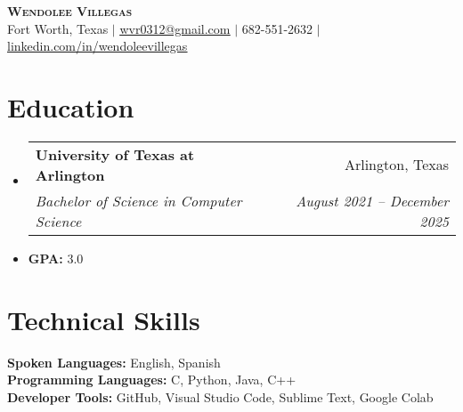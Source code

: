 \documentclass[letterpaper,11pt]{article}
\makeatletter
\newcommand{\resumeItem}[1]{
  \item\small{
    {#1 \vspace{-2pt}}
  }
}
\newcommand{\resumeSubheading}[4]{
  \vspace{-2pt}\item
    \begin{tabular*}{0.97\textwidth}[t]{l@{\extracolsep{\fill}}r}
      \textbf{#1} & #2 \\
      \textit{\small#3} & \textit{\small #4} \\
    \end{tabular*}\vspace{-7pt}
}
\newcommand{\resumeSubHeadingListStart}{\begin{itemize}[leftmargin=0.15in, label={}]}
\newcommand{\resumeSubHeadingListEnd}{\end{itemize}}
\makeatother
\begin{document}

\begin{center}
    \textbf{\Huge \scshape Wendolee Villegas} \\ \vspace{1pt}
    \small Fort Worth, Texas $|$ \href{mailto:x@x.com}{\underline{wvr0312@gmail.com}} $|$ \small 682-551-2632 $|$
    \href{https://www.linkedin.com/in/wendolee-villegas-565440252/}{\underline{linkedin.com/in/wendoleevillegas}}
\end{center}


\section{Education}
  \resumeSubHeadingListStart
    \resumeSubheading
      {University of Texas at Arlington}{Arlington, Texas}
      {Bachelor of Science in Computer Science}{August 2021 -- December 2025}
      \item \textbf {GPA:}{ 3.0}
  \resumeSubHeadingListEnd

\section{Technical Skills}
 \begin{itemize}[leftmargin=0.15in, label={}]
    \small{\item{
     \textbf{Spoken Languages:}{ English, Spanish} \\
     \textbf{Programming Languages:}{ C, Python, Java, C++} \\
     \textbf{Developer Tools:}{ GitHub, Visual Studio Code, Sublime Text, Google Colab} \\
    }}
 \end{itemize}
\end{document}
